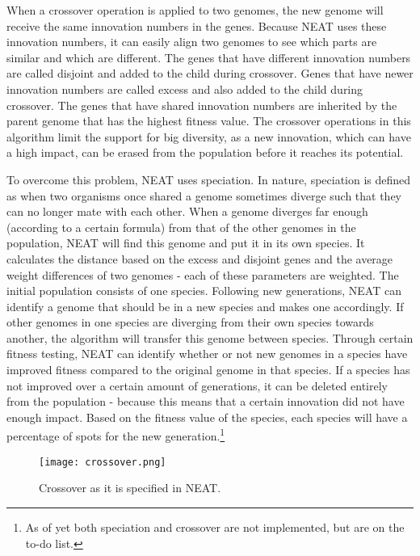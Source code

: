 When a crossover operation is applied to two genomes, the new genome will receive the same innovation numbers in the genes.
Because NEAT uses these innovation numbers, it can easily align two genomes to see which parts are similar and which are different.
The genes that have different innovation numbers are called disjoint and added to the child during crossover.
Genes that have newer innovation numbers are called excess and also added to the child during crossover.
The genes that have shared innovation numbers are inherited by the parent genome that has the highest fitness value.
The crossover operations in this algorithm limit the support for big diversity, as a new innovation, which can have a high impact, can be erased from the population before it reaches its potential.

To overcome this problem, NEAT uses speciation.
In nature, speciation is defined as when two organisms once shared a genome sometimes diverge such that they can no longer mate with each other.
When a genome diverges far enough (according to a certain formula) from that of the other genomes in the population, NEAT will find this genome and put it in its own species.
It calculates the distance based on the excess and disjoint genes and the average weight differences of two genomes - each of these parameters are weighted.
The initial population consists of one species.
Following new generations, NEAT can identify a genome that should be in a new species and makes one accordingly.
If other genomes in one species are diverging from their own species towards another, the algorithm will transfer this genome between species.
Through certain fitness testing, NEAT can identify whether or not new genomes in a species have improved fitness compared to the original genome in that species.
If a species has not improved over a certain amount of generations, it can be deleted entirely from the population - because this means that a certain innovation did not have enough impact.
Based on the fitness value of the species, each species will have a percentage of spots for the new generation.\footnote{As of yet both speciation and crossover are not implemented, but are on the to-do list.}

\begin{figure}[H]
\centering
\texttt{[image: crossover.png]}
\caption{Crossover as it is specified in NEAT.}
\label{fig:cross}
\end{figure}

